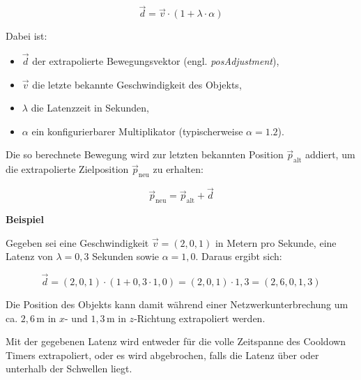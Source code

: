 \begin{enumerate}
\[
\vec{d} = \vec{v} \cdot \left(1 + \lambda \cdot \alpha\right)
\]

Dabei ist:
\begin{itemize}
    \item $\vec{d}$ der extrapolierte Bewegungsvektor (engl. \textit{posAdjustment}),
    \item $\vec{v}$ die letzte bekannte Geschwindigkeit des Objekts,
    \item $\lambda$ die Latenzzeit in Sekunden,
    \item $\alpha$ ein konfigurierbarer Multiplikator (typischerweise $\alpha = 1.2$).
\end{itemize}

Die so berechnete Bewegung wird zur letzten bekannten Position $\vec{p}_\text{alt}$ addiert, um die extrapolierte Zielposition $\vec{p}_\text{neu}$ zu erhalten:

\[
\vec{p}_\text{neu} = \vec{p}_\text{alt} + \vec{d}
\]

\textbf{Beispiel}

Gegeben sei eine Geschwindigkeit $\vec{v} = (2, 0, 1)$ in Metern pro Sekunde, eine Latenz von $\lambda = 0{,}3$ Sekunden sowie $\alpha = 1{,}0$. Daraus ergibt sich:

\[
\vec{d} = (2, 0, 1) \cdot (1 + 0{,}3 \cdot 1{,}0) = (2, 0, 1) \cdot 1{,}3 = (2{,}6, 0, 1{,}3)
\]

Die Position des Objekts kann damit während einer Netzwerkunterbrechung um ca. $2{,}6\,\text{m}$ in $x$- und $1{,}3\,\text{m}$ in $z$-Richtung extrapoliert werden.

\newpage

Mit der gegebenen Latenz wird entweder für die volle Zeitspanne des Cooldown Timers extrapoliert, oder es wird abgebrochen, falls die Latenz über oder unterhalb der Schwellen liegt.


\end{enumerate}
